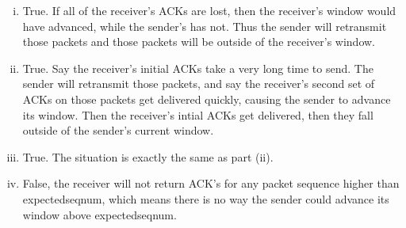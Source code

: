 \documentclass[11pt]{article}
\begin{document}
\begin{enumerate}[(a)]
      \begin{enumerate}[(i)]
        \item
          True. If all of the receiver's ACKs are lost, then the receiver's window
          would have advanced, while the sender's has not. Thus the sender will
          retransmit those packets and those packets will be outside of the
          receiver's window.
        \item
          True. Say the receiver's initial ACKs take a very long time to send.
          The sender will retransmit those packets, and say the receiver's second
          set of ACKs on those packets get delivered quickly, causing the sender
          to advance its window. Then the receiver's intial ACKs get delivered,
          then they fall outside of the sender's current window.
        \item
          True. The situation is exactly the same as part (ii).
        \item
          False, the receiver will not return ACK's for any packet sequence higher than
          expectedseqnum, which means there is no way the sender could advance its
          window above expectedseqnum.
      \end{enumerate}
  \end{enumerate}
\end{document}

